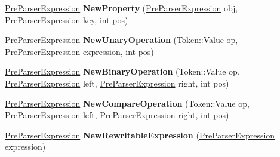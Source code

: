 \begin{DoxyCompactItemize}
\item 
\hyperlink{classv8_1_1internal_1_1_pre_parser_expression}{Pre\+Parser\+Expression} {\bfseries New\+Property} (\hyperlink{classv8_1_1internal_1_1_pre_parser_expression}{Pre\+Parser\+Expression} obj, \hyperlink{classv8_1_1internal_1_1_pre_parser_expression}{Pre\+Parser\+Expression} key, int pos)\hypertarget{classv8_1_1internal_1_1_pre_parser_factory_a0f1b2ceafa3241d33bbe10cdca095998}{}\label{classv8_1_1internal_1_1_pre_parser_factory_a0f1b2ceafa3241d33bbe10cdca095998}

\item 
\hyperlink{classv8_1_1internal_1_1_pre_parser_expression}{Pre\+Parser\+Expression} {\bfseries New\+Unary\+Operation} (Token\+::\+Value op, \hyperlink{classv8_1_1internal_1_1_pre_parser_expression}{Pre\+Parser\+Expression} expression, int pos)\hypertarget{classv8_1_1internal_1_1_pre_parser_factory_ad2cb4901b18a404a712232e2798f72ff}{}\label{classv8_1_1internal_1_1_pre_parser_factory_ad2cb4901b18a404a712232e2798f72ff}

\item 
\hyperlink{classv8_1_1internal_1_1_pre_parser_expression}{Pre\+Parser\+Expression} {\bfseries New\+Binary\+Operation} (Token\+::\+Value op, \hyperlink{classv8_1_1internal_1_1_pre_parser_expression}{Pre\+Parser\+Expression} left, \hyperlink{classv8_1_1internal_1_1_pre_parser_expression}{Pre\+Parser\+Expression} right, int pos)\hypertarget{classv8_1_1internal_1_1_pre_parser_factory_a3dc279212140af16337c2889d913f1f5}{}\label{classv8_1_1internal_1_1_pre_parser_factory_a3dc279212140af16337c2889d913f1f5}

\item 
\hyperlink{classv8_1_1internal_1_1_pre_parser_expression}{Pre\+Parser\+Expression} {\bfseries New\+Compare\+Operation} (Token\+::\+Value op, \hyperlink{classv8_1_1internal_1_1_pre_parser_expression}{Pre\+Parser\+Expression} left, \hyperlink{classv8_1_1internal_1_1_pre_parser_expression}{Pre\+Parser\+Expression} right, int pos)\hypertarget{classv8_1_1internal_1_1_pre_parser_factory_a192024d13ed7e968dde055ed7fea08bf}{}\label{classv8_1_1internal_1_1_pre_parser_factory_a192024d13ed7e968dde055ed7fea08bf}

\item 
\hyperlink{classv8_1_1internal_1_1_pre_parser_expression}{Pre\+Parser\+Expression} {\bfseries New\+Rewritable\+Expression} (\hyperlink{classv8_1_1internal_1_1_pre_parser_expression}{Pre\+Parser\+Expression} expression)\hypertarget{classv8_1_1internal_1_1_pre_parser_factory_a2b0ecf7e382c3090b78fb66330c5bc23}{}\label{classv8_1_1internal_1_1_pre_parser_factory_a2b0ecf7e382c3090b78fb66330c5bc23}


\end{DoxyCompactItemize}
